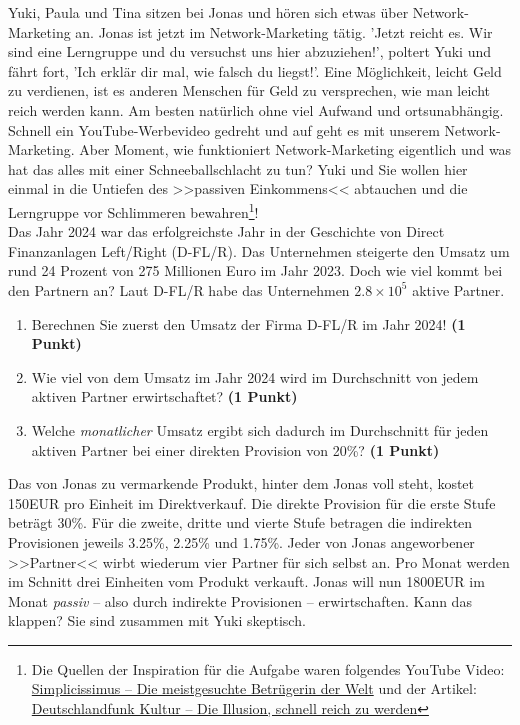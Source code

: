 \documentclass[a4paper, 9pt]{scrartcl}\usepackage[]{graphicx}\usepackage[]{xcolor}
\begin{document}
Yuki, Paula und Tina sitzen bei Jonas und hören sich etwas über Network-Marketing an. Jonas ist jetzt im Network-Marketing tätig. 'Jetzt reicht es. Wir sind eine Lerngruppe und du versuchst uns hier abzuziehen!', poltert Yuki und fährt fort, 'Ich erklär dir mal, wie falsch du liegst!'. Eine Möglichkeit, leicht Geld zu verdienen, ist es anderen Menschen für Geld zu versprechen, wie man leicht reich werden kann. Am besten natürlich ohne viel Aufwand und ortsunabhängig. Schnell ein YouTube-Werbevideo gedreht und auf geht es mit unserem Network-Marketing. Aber Moment, wie funktioniert Network-Marketing eigentlich und was hat das alles mit einer Schneeballschlacht zu tun? Yuki und Sie wollen hier einmal in die Untiefen des >>passiven Einkommens<< abtauchen und die Lerngruppe vor Schlimmeren bewahren\footnote{Die Quellen der Inspiration für die Aufgabe waren folgendes YouTube Video: \href{https://youtu.be/UOKkZF_qK9M?si=uf4foJVFKfeQMwSw}{Simplicissimus -- Die meistgesuchte Betrügerin der Welt} und der Artikel: \href{https://www.deutschlandfunkkultur.de/netzwerk-marketing-die-illusion-schnell-reich-zu-werden-100.html}{Deutschlandfunk Kultur -- Die Illusion, schnell reich zu werden}}!\\

Das Jahr 2024 war das erfolgreichste Jahr in der Geschichte von Direct Finanzanlagen Left/Right (D-FL/R). Das Unternehmen steigerte den Umsatz um rund 24 Prozent von 275 Millionen Euro im Jahr 2023. Doch wie viel kommt bei den Partnern an? Laut D-FL/R habe das Unternehmen \ensuremath{2.8\times 10^{5}} aktive Partner.

\begin{enumerate}
\item Berechnen Sie zuerst den Umsatz der Firma D-FL/R im Jahr 2024! \textbf{(1 Punkt)}
\item Wie viel von dem Umsatz im Jahr 2024 wird im Durchschnitt von jedem aktiven Partner erwirtschaftet? \textbf{(1 Punkt)}
\item Welche \textit{monatlicher} Umsatz ergibt sich dadurch im Durchschnitt für jeden aktiven Partner bei einer direkten Provision von 20\%? \textbf{(1 Punkt)}
\end{enumerate}

Das von Jonas zu vermarkende Produkt, hinter dem Jonas voll steht, kostet 150EUR pro Einheit im Direktverkauf. Die direkte Provision für die erste Stufe beträgt 30\%. Für die zweite, dritte und vierte Stufe betragen die indirekten Provisionen jeweils 3.25\%, 2.25\% und 1.75\%. Jeder von Jonas angeworbener >>Partner<< wirbt wiederum vier Partner für sich selbst an. Pro Monat werden im Schnitt drei Einheiten vom Produkt verkauft. Jonas will nun 1800EUR im Monat \textit{passiv} -- also durch indirekte Provisionen -- erwirtschaften. Kann das klappen? Sie sind zusammen mit Yuki skeptisch.
\end{document}
